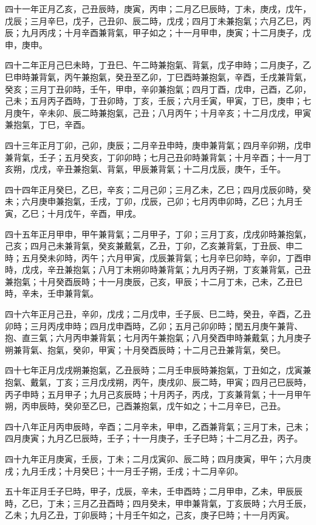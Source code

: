 \begin{pinyinscope}
四十一年正月乙亥，己丑辰時，庚寅，丙申；二月乙巳辰時，丁未，庚戌，戊午，戊辰；三月辛巳，戊子，己丑卯、辰二時，戊戌；四月丁未兼抱氣；六月乙巳，丙辰；九月丙戌；十月辛酉兼背氣，甲子如之；十一月甲申，庚寅；十二月庚子，戊申，庚申。

四十二年正月己巳未時，丁丑巳、午二時兼抱氣、背氣，戊子申時；二月庚子，乙巳申時兼背氣，丙午兼抱氣，癸丑至乙卯，丁巳酉時兼抱氣，辛酉，壬戌兼背氣，癸亥；三月丁丑卯時，壬午，甲申，辛卯兼抱氣；四月丁酉，戊申，己酉，乙卯，己未；五月丙子酉時，丁丑卯時，丁亥，壬辰；六月壬寅，甲寅，丁巳，庚申；七月庚午，辛未卯、辰二時兼抱氣，己丑；八月丙午；十月辛亥；十二月戊戌，甲寅兼抱氣，丁巳，辛酉。

四十三年正月丁卯，己卯，庚辰；二月辛丑申時，庚申兼背氣；四月辛卯朔，戊申兼背氣，壬子；五月癸亥，丁卯卯時；七月己丑卯時兼背氣；十月辛酉；十一月丁亥朔，戊戌，辛丑兼抱氣、背氣，甲辰兼背氣；十二月戊辰，庚午，壬午。

四十四年正月癸巳，乙巳，辛亥；二月己卯；三月乙未，乙巳；四月戊辰卯時，癸未；六月庚申兼抱氣，壬戌，丁卯，戊辰，己卯；七月丙申卯時，乙巳；九月壬寅，乙巳；十月戊午，辛酉，甲戌。

四十五年正月甲申，甲午兼背氣；二月甲子，丁卯；三月丁亥，戊戌卯時兼抱氣，己亥；四月己未兼背氣，癸亥兼戴氣，乙丑，丁卯，乙亥兼背氣，丁丑辰、申二時；五月癸未卯時，丙午；六月甲寅，戊辰兼背氣；七月辛巳卯時，辛卯，丁酉申時，戊戌，辛丑兼抱氣；八月丁未朔卯時兼背氣；九月丙子朔，丁亥兼背氣，己丑兼抱氣；十月癸酉辰時；十一月庚辰，己亥，甲辰；十二月丁未，己未，乙丑巳時，辛未，壬申兼背氣。

四十六年正月己丑，辛卯，戊戌；二月戊申，壬子辰、巳二時，癸丑，辛酉，乙丑卯時；三月丙戌申時；四月戊申酉時，乙卯；五月己卯卯時；閏五月庚午兼背、抱、直三氣；六月丙申兼背氣；七月丙午兼抱氣；八月癸酉申時兼戴氣；九月庚子朔兼背氣、抱氣，癸卯，甲寅；十月癸酉辰時；十二月己丑兼背氣，癸巳。

四十七年正月戊戌朔兼抱氣，乙丑辰時；二月壬申辰時兼抱氣，丁丑如之，戊寅兼抱氣、戴氣，丁亥；三月戊戌朔，丙午，庚戌卯、辰二時，甲寅；四月己巳辰時，丙子申時；五月甲子；九月己亥辰時；十月丙子，丙戌，丁亥兼背氣；十一月甲午朔，丙申辰時，癸卯至乙巳，己酉兼抱氣，戊午如之；十二月辛巳，己丑。

四十八年正月丙申辰時，辛酉；二月辛未，甲申，乙酉兼背氣；三月丁未，己未；四月庚寅；九月乙巳辰時，壬子；十一月庚子，壬子巳時；十二月乙丑，丙子。

四十九年正月庚寅，壬辰，丁未；二月戊寅卯、辰二時；四月庚寅，甲午；六月庚戌；九月壬戌；十月癸巳；十一月壬子朔，壬戌；十二月辛卯。

五十年正月壬子巳時，甲子，戊辰，辛未，壬申酉時；二月甲申，乙未，甲辰辰時，乙巳，丁未；三月乙丑酉時；四月癸未，甲申兼背氣，丁亥辰時；六月壬辰，乙未；九月乙丑，丁卯辰時；十月壬午如之，己亥，庚子巳時；十一月丙寅。


\end{pinyinscope}
